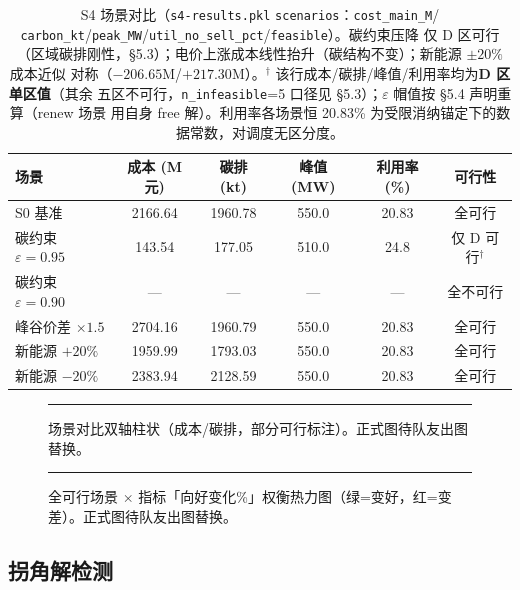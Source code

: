 \documentclass{internal-report}
\begin{document}
\begin{table}[H]
\centering
\footnotesize
\begin{tabular}{lccccc}
\toprule
场景 & 成本 (M元) & 碳排 (kt) & 峰值 (MW) & 利用率 (\%) & 可行性 \\
\midrule
S0 基准 & 2166.64 & 1960.78 & 550.0 & 20.83 & 全可行 \\
碳约束 $\varepsilon{=}0.95$ & 143.54 & 177.05 & 510.0 & 24.8 & 仅 D 可行$^{\dagger}$ \\
碳约束 $\varepsilon{=}0.90$ & --- & --- & --- & --- & 全不可行 \\
峰谷价差 $\times 1.5$ & 2704.16 & 1960.79 & 550.0 & 20.83 & 全可行 \\
新能源 $+20\%$ & 1959.99 & 1793.03 & 550.0 & 20.83 & 全可行 \\
新能源 $-20\%$ & 2383.94 & 2128.59 & 550.0 & 20.83 & 全可行 \\
\bottomrule
\end{tabular}
\caption{S4 场景对比（\texttt{s4-results.pkl} \texttt{scenarios}：\texttt{cost\_main\_M}/
\texttt{carbon\_kt}/\texttt{peak\_MW}/\texttt{util\_no\_sell\_pct}/\texttt{feasible}）。碳约束压降
仅 D 区可行（区域碳排刚性，§5.3）；电价上涨成本线性抬升（碳结构不变）；新能源 $\pm20\%$ 成本近似
对称（$-206.65$M/$+217.30$M）。$^{\dagger}$ 该行成本/碳排/峰值/利用率均为\textbf{D 区单区值}（其余
五区不可行，\texttt{n\_infeasible}=5 口径见 §5.3）；$\varepsilon$ 帽值按 §5.4 声明重算（renew 场景
用自身 free 解）。利用率各场景恒 20.83\% 为受限消纳锚定下的数据常数，对调度无区分度。}
\label{tab:scenario}
\end{table}

\begin{figure}[H]
\centering
\rule{0.9\textwidth}{4cm}
\caption{场景对比双轴柱状（成本/碳排，部分可行标注）。正式图待队友出图替换。}
\label{fig:scen}
\end{figure}

\begin{figure}[H]
\centering
\rule{0.9\textwidth}{4cm}
\caption{全可行场景 $\times$ 指标「向好变化\%」权衡热力图（绿=变好，红=变差）。正式图待队友出图替换。}
\label{fig:heat}
\end{figure}

\subsection{拐角解检测}
\label{sec:corner}
\end{document}
